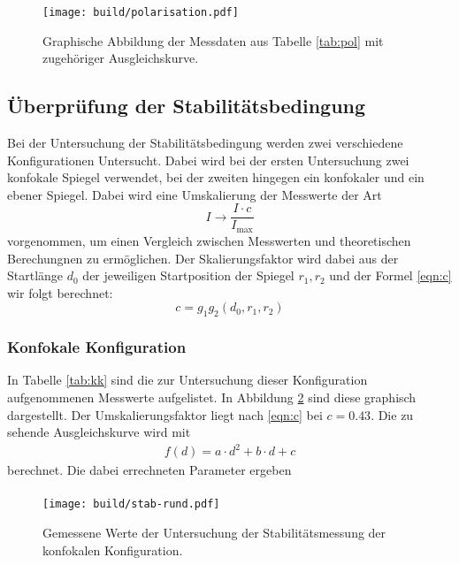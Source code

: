 \begin{figure}[htb]
  \centering
  \texttt{[image: build/polarisation.pdf]}
  \caption{Graphische Abbildung der Messdaten aus Tabelle \ref{tab:pol} mit zugehöriger Ausgleichskurve.}
  \label{plt:pol}
\end{figure}


\FloatBarrier

\subsection{Überprüfung der Stabilitätsbedingung}
Bei der Untersuchung der Stabilitätsbedingung werden zwei verschiedene
Konfigurationen Untersucht. Dabei wird bei der ersten Untersuchung zwei
konfokale Spiegel verwendet, bei der zweiten hingegen ein konfokaler und
ein ebener Spiegel. Dabei wird eine Umskalierung der Messwerte der Art
\begin{equation*}
  I \rightarrow \frac{I \cdot c}{I_\text{max}}
\end{equation*}
vorgenommen, um einen Vergleich zwischen Messwerten und theoretischen
Berechungnen zu ermöglichen.
Der Skalierungsfaktor wird dabei aus der Startlänge $d_0$ der jeweiligen
Startposition der Spiegel $r_1, r_2$ und der Formel \ref{eqn:c} wir folgt
berechnet:
\begin{equation}
  c = g_1g_2(d_0,r_1,r_2)
  \label{eqn:c}
\end{equation}

\subsubsection{Konfokale Konfiguration}
In Tabelle \ref{tab:kk} sind die zur Untersuchung dieser Konfiguration
aufgenommenen Messwerte aufgelistet. In Abbildung \ref{plt:kk} sind diese
graphisch dargestellt. Der Umskalierungsfaktor liegt nach \ref{eqn:c} bei
$c = \num{0,43}$. Die zu sehende Ausgleichskurve wird mit
\begin{align*}
  f(d) = a\cdot d^2 + b\cdot d + c
\end{align*}
berechnet. Die dabei errechneten Parameter ergeben
\begin{align*}
\end{align*}

\begin{figure}[htb]
  \centering
  \texttt{[image: build/stab-rund.pdf]}
  \caption{Gemessene Werte der Untersuchung der Stabilitätsmessung der konfokalen Konfiguration. }
  \label{plt:kk}
\end{figure}

